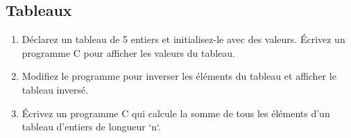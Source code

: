 \subsection{Tableaux}
\begin{enumerate}
	\item Déclarez un tableau de 5 entiers et initialisez-le avec des valeurs. Écrivez un programme C pour afficher les valeurs du tableau.
	\item Modifiez le programme pour inverser les éléments du tableau et afficher le tableau inversé.
		
			
			
			
			
	
	\item Écrivez un programme C qui calcule la somme de tous les éléments d'un tableau d'entiers de longueur `n`.
		
			
			
		
			
			
			
	

\end{enumerate}
